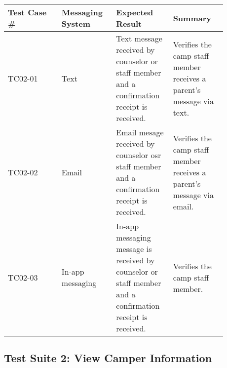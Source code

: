 \documentclass[11pt]{article}
\begin{document}
\begin{center}
\begin{longtable}{|p{0.22\linewidth}|p{0.22\linewidth}|p{0.22\linewidth}|p{0.22\linewidth}|}
	\hline
	Test Case \# & Messaging System & Expected Result & Summary\\\hline
	TC02-01 & Text & Text message received by counselor or staff member and a confirmation receipt is received. & Verifies the camp staff member receives a parent's message via text.\vspace*{1em}\\\hline
	TC02-02 & Email & Email mesage received by counselor osr staff member and a confirmation receipt is received. & Verifies the camp staff member receives a parent's message via email. \vspace*{1em}\\	\hline
	TC02-03 & In-app messaging & In-app messaging message is received by counselor or staff member and a confirmation receipt is received. & Verifies the camp staff member.\vspace*{1em}\\\hline
\end{longtable}
\end{center}
\clearpage


\subsection*{Test Suite 2: View Camper Information}
\end{document}
